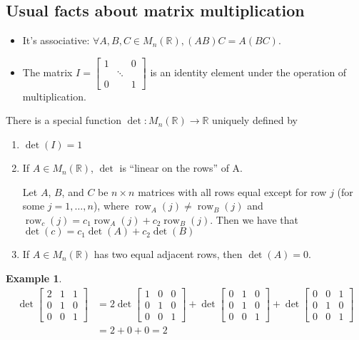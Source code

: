 \documentclass[12pt,letterpaper,DIV=11,final]{scrartcl}
\theoremstyle{plain}
\theoremstyle{definition}
\newtheorem{example}{Example}[section]
\theoremstyle{remark}
\DeclareMathOperator{\row}{row}
\begin{document}
\subsection{Usual facts about matrix multiplication}
\begin{itemize}
  \item It's associative: $\forall A, B, C \in M_n(\mathbb{R}), (AB) C = A (BC)$.
  \item The matrix $I = \begin{bmatrix}
      1 &        & 0 \\
        & \ddots & \\
      0 &        & 1
    \end{bmatrix}$ is an identity element under the operation of multiplication.
\end{itemize}
There is a special function $\det : M_n(\mathbb{R}) \to \mathbb{R}$ uniquely defined by
\begin{enumerate}
  \item $\det(I) = 1$
  \item If $A \in M_n(\mathbb{R})$, $\det$ is \enquote{linear on the rows} of A.

    Let $A$, $B$, and $C$ be $n \times n$ matrices with all rows equal except for row $j$ (for some $j = 1, \dots, n$),
    where $\row_A(j) \neq \row_B(j)$ and $\row_c(j) = c_1 \row_A(j) + c_2 \row_B(j)$.
    Then we have that $\det(c) = c_1 \det(A) + c_2 \det(B)$

  \item If $A \in M_n(\mathbb{R})$ has two equal adjacent rows, then $\det(A) = 0$.
\end{enumerate}

\begin{example}
  \begin{align*}
    \det\begin{bmatrix}
      2 & 1 & 1 \\
      0 & 1 & 0 \\
      0 & 0 & 1
    \end{bmatrix} &= 2 \det%
    \begin{bmatrix}
      1 & 0 & 0 \\
      0 & 1 & 0 \\
      0 & 0 & 1
    \end{bmatrix} + \det%
    \begin{bmatrix}
      0 & 1 & 0 \\
      0 & 1 & 0 \\
      0 & 0 & 1
    \end{bmatrix} + \det%
    \begin{bmatrix}
      0 & 0 & 1 \\
      0 & 1 & 0 \\
      0 & 0 & 1
    \end{bmatrix} \\
                &= 2 + 0 + 0 = 2
  \end{align*}
\end{example}
\end{document}
